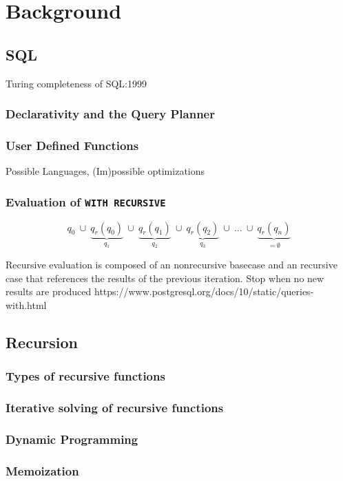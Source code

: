 \chapter{Background}\label{Introduction}
\section{SQL}\label{theory}
Turing completeness of SQL:1999
\subsection{Declarativity and the Query Planner}

\subsection{User Defined Functions}
Possible Languages, (Im)possible optimizations

\subsection{Evaluation of \texttt{WITH RECURSIVE}}
$$
q_0 ~\cup ~\underbrace{q_r(q_0)}_{q_1} ~\cup~ \underbrace{q_r(q_1)}_{q_2}~ \cup~\underbrace{q_r(q_2)}_{q_3}~ \cup ~\hdots ~ \cup ~ \underbrace{q_r(q_n)}_{= \emptyset}
$$

Recursive evaluation is composed of an nonrecursive basecase and an recursive case that references the results of the previous iteration.
Stop when no new results are produced
https://www.postgresql.org/docs/10/static/queries-with.html

\section{Recursion}
\subsection{Types of recursive functions}
\subsection{Iterative solving of recursive functions}
\subsection{Dynamic Programming}
\subsection{Memoization}

